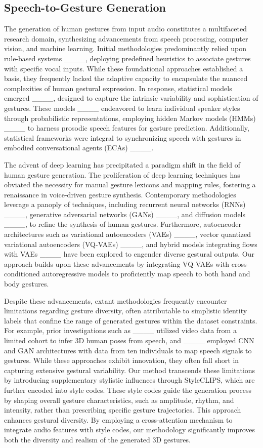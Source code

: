 \subsection{Speech-to-Gesture Generation}
The generation of human gestures from input audio constitutes a multifaceted research domain, synthesizing advancements from speech processing, computer vision, and machine learning. Initial methodologies predominantly relied upon rule-based systems ____, deploying predefined heuristics to associate gestures with specific vocal inputs. While these foundational approaches established a basis, they frequently lacked the adaptive capacity to encapsulate the nuanced complexities of human gestural expression. In response, statistical models emerged ____, designed to capture the intrinsic variability and sophistication of gestures. These models ____ endeavored to learn individual speaker styles through probabilistic representations, employing hidden Markov models (HMMs) ____ to harness prosodic speech features for gesture prediction. Additionally, statistical frameworks were integral to synchronizing speech with gestures in embodied conversational agents (ECAs) ____.

The advent of deep learning has precipitated a paradigm shift in the field of human gesture generation. The proliferation of deep learning techniques has obviated the necessity for manual gesture lexicons and mapping rules, fostering a renaissance in voice-driven gesture synthesis. Contemporary methodologies leverage a panoply of techniques, including recurrent neural networks (RNNs) ____, generative adversarial networks (GANs) ____, and diffusion models ____, to refine the synthesis of human gestures. Furthermore, autoencoder architectures such as variational autoencoders (VAEs) ____, vector quantized variational autoencoders (VQ-VAEs) ____, and hybrid models integrating flows with VAEs ____ have been explored to engender diverse gestural outputs. Our approach builds upon these advancements by integrating VQ-VAEs with cross-conditioned autoregressive models to proficiently map speech to both hand and body gestures.

Despite these advancements, extant methodologies frequently encounter limitations regarding gesture diversity, often attributable to simplistic identity labels that confine the range of generated gestures within the dataset constraints. For example, prior investigations such as ____ utilized video data from a limited cohort to infer 3D human poses from speech, and ____ employed CNN and GAN architectures with data from ten individuals to map speech signals to gestures. While these approaches exhibit innovation, they often fall short in capturing extensive gestural variability. Our method transcends these limitations by introducing supplementary stylistic influences through StyleCLIPS, which are further encoded into style codes. These style codes guide the generation process by shaping overall gesture characteristics, such as amplitude, rhythm, and intensity, rather than prescribing specific gesture trajectories. This approach enhances gestural diversity. By employing a cross-attention mechanism to integrate audio features with style codes, our methodology significantly improves both the diversity and realism of the generated 3D gestures.